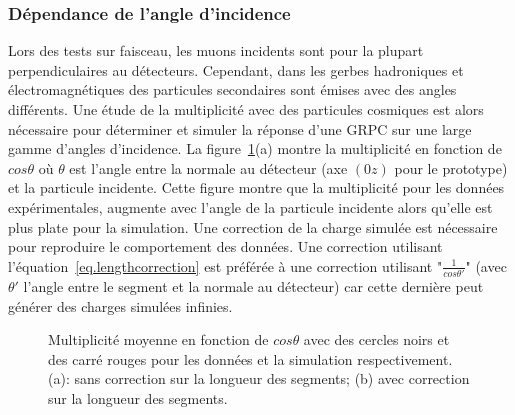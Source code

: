 \subsubsection{Dépendance de l'angle d'incidence}
Lors des tests sur faisceau, les muons incidents sont pour la plupart perpendiculaires au détecteurs. Cependant, dans les gerbes hadroniques et électromagnétiques des particules secondaires sont émises avec des angles différents. Une étude de la multiplicité avec des particules cosmiques est alors nécessaire pour déterminer et simuler la réponse d'une GRPC sur une large gamme d'angles d'incidence. La figure~\ref{fig.mul_vs_theta}(a) montre la multiplicité en fonction de $cos{\theta}$ où $\theta$ est l'angle entre la normale au détecteur (axe $(0z)$ pour le prototype) et la particule incidente. Cette figure montre que la multiplicité pour les données expérimentales, augmente avec l'angle de la particule incidente alors qu'elle est plus plate pour la simulation. Une correction de la charge simulée est nécessaire pour reproduire le comportement des données. Une correction utilisant l'équation~\ref{eq.lengthcorrection} est préférée à une correction utilisant "$\frac{1}{cos\theta'}$" (avec $\theta'$ l'angle entre le segment et la normale au détecteur) car cette dernière peut générer des charges simulées infinies. 
\begin{figure}[!ht]
  \caption{Multiplicité moyenne en fonction de $cos\theta$ avec des cercles noirs et des carré rouges pour les données et la simulation respectivement. (a): sans correction sur la longueur des segments; (b) avec correction sur la longueur des segments. \label{fig.mul_vs_theta}}
\end{figure}

